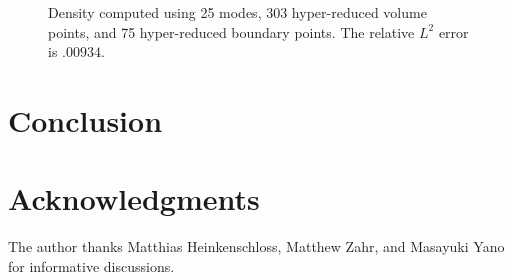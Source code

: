 \documentclass[review]{siamart171218}
\theoremstyle{assumption}
\begin{document}
\begin{figure}
\centering
{}
\hspace{.1em}
\hspace{.1em}
\caption{Density computed using 25 modes, 303 hyper-reduced volume points, and 75 hyper-reduced boundary points.  The relative $L^2$ error is $.00934$.}
\label{fig:pulse2d}
\end{figure}

\section{Conclusion}

\section{Acknowledgments}

The author thanks Matthias Heinkenschloss, Matthew Zahr, and Masayuki Yano for informative discussions.



\end{document}
